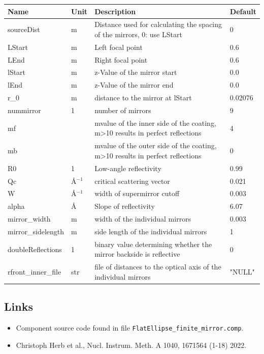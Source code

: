 \begin{longtable}{p{}p{}p{}p{}}
\toprule
\textbf{Name} & \textbf{Unit} & \textbf{Description} & \textbf{Default} \\
\midrule
\endhead
sourceDist & m & Distance used for calculating the spacing of the mirrors, 0: use LStart & 0 \\
LStart & m & Left focal point & 0.6 \\
LEnd & m & Right focal point & 0.6 \\
lStart & m & z-Value of the mirror start & 0.0 \\
lEnd & m & z-Value of the mirror end & 0.0 \\
r\_0 & m & distance to the mirror at lStart & 0.02076 \\
nummirror & 1 & number of mirrors & 9 \\
mf &   & mvalue of the inner side of the coating, m\textgreater{}10 results in perfect reflections & 4 \\
mb &   & mvalue of the outer side of the coating, m\textgreater{}10 results in perfect reflections & 0 \\
R0 & 1 & Low-angle reflectivity & 0.99 \\
Qc & \AA{}$^{-1}$ & critical scattering vector & 0.021 \\
W & \AA{}$^{-1}$ & width of supermirror cutoff & 0.003 \\
alpha & \AA{} & Slope of reflectivity & 6.07 \\
mirror\_width & m & width of the individual mirrors & 0.003 \\
mirror\_sidelength & m & side length of the individual mirrors & 1 \\
doubleReflections & 1 & binary value determining whether the mirror backside is reflective & 0 \\
rfront\_inner\_file & str & file of distances to the optical axis of the individual mirrors & "NULL" \\
\bottomrule
\end{longtable}

\subsection*{Links}
\begin{itemize}
  \item Component source code found in file \texttt{FlatEllipse\_finite\_mirror.comp}.
  \item Christoph Herb et al., Nucl. Instrum. Meth. A 1040, 1671564 (1-18) 2022.
\end{itemize}
